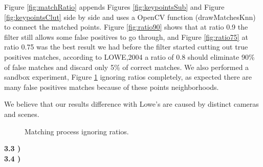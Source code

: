 \documentclass[12pt,a4paper]{article}
\begin{document}
	Figure \ref{fig:matchRatio} appends Figures \ref{fig:keypointsSub} and Figure \ref{fig:keypointsClut} side by side and uses a OpenCV function (drawMatchesKnn) to connect the matched points. Figure \ref{fig:ratio90} shows that at ratio 0.9 the filter still allows some false positives to go through, and Figure \ref{fig:ratio75} at ratio 0.75 was the best result we had before the filter started cutting out true positives matches, according to LOWE,2004 a ratio of 0.8 should eliminate 90\% of false matches and discard only 5\% of correct matches. We also performed a sandbox experiment, Figure \ref{fig:noRatio} ignoring ratios completely, as expected there are many false positives matches because of these points neighborhoods.
\par
	We believe that our results difference with Lowe's are caused by distinct cameras and scenes.\\

\begin{figure}[!h]
	\centering
		{
			\setlength{\fboxsep}{1pt}
			\setlength{\fboxrule}{1pt}
		}
	\caption{Matching process ignoring ratios.}
	\label{fig:noRatio}
\end{figure}

\textbf{3.3 )}
\\
\textbf{3.4 )}
\\
\end{document}
